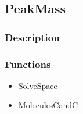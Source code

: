 \subsection{PeakMass}\label{PeakMass}
\subsubsection{Description}


\subsubsection{Functions}
\begin{itemize}
\item \hyperref[SolveSpace]{SolveSpace}
\item \hyperref[MoleculesCand]{MoleculesCandC}
\end{itemize}

